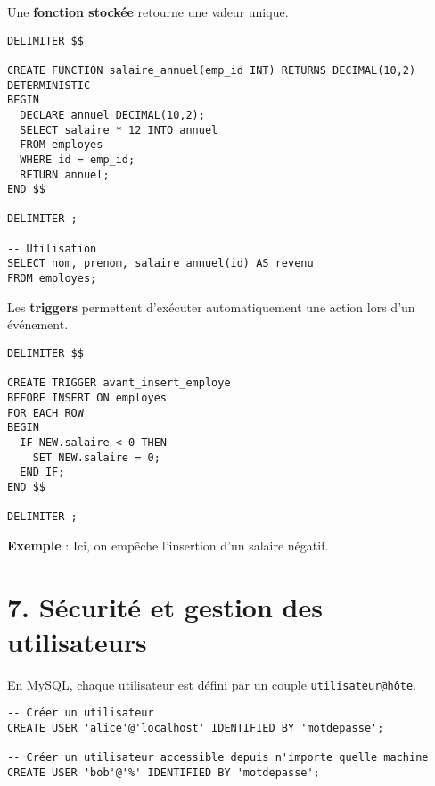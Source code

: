 \documentclass[a4paper,11pt]{article}
\begin{document}
\begin{tcolorbox}[colback=orange!5!white,colframe=orange!75!black,title=Fonctions stockées]
Une \textbf{fonction stockée} retourne une valeur unique.

\begin{verbatim}
DELIMITER $$

CREATE FUNCTION salaire_annuel(emp_id INT) RETURNS DECIMAL(10,2)
DETERMINISTIC
BEGIN
  DECLARE annuel DECIMAL(10,2);
  SELECT salaire * 12 INTO annuel
  FROM employes
  WHERE id = emp_id;
  RETURN annuel;
END $$

DELIMITER ;

-- Utilisation
SELECT nom, prenom, salaire_annuel(id) AS revenu
FROM employes;
\end{verbatim}
\end{tcolorbox}

\begin{tcolorbox}[colback=red!5!white,colframe=red!75!black,title=Déclencheurs (TRIGGERS)]
Les \textbf{triggers} permettent d’exécuter automatiquement une action lors d’un événement.

\begin{verbatim}
DELIMITER $$

CREATE TRIGGER avant_insert_employe
BEFORE INSERT ON employes
FOR EACH ROW
BEGIN
  IF NEW.salaire < 0 THEN
    SET NEW.salaire = 0;
  END IF;
END $$

DELIMITER ;
\end{verbatim}

\textbf{Exemple} : Ici, on empêche l’insertion d’un salaire négatif.
\end{tcolorbox}

\section*{7. Sécurité et gestion des utilisateurs}

\begin{tcolorbox}[colback=blue!5!white,colframe=blue!75!black,title=Création et gestion des utilisateurs]
En MySQL, chaque utilisateur est défini par un couple \texttt{utilisateur@hôte}.  
\begin{verbatim}
-- Créer un utilisateur
CREATE USER 'alice'@'localhost' IDENTIFIED BY 'motdepasse';

-- Créer un utilisateur accessible depuis n'importe quelle machine
CREATE USER 'bob'@'%' IDENTIFIED BY 'motdepasse';
\end{verbatim}
\end{tcolorbox}
\end{document}
